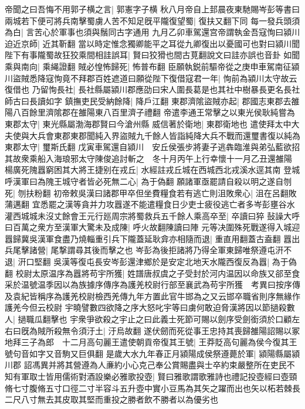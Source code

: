 帝聞之曰吾悔不用郭子横之言|{
	郭憲字子横}
秋八月帝自上邽晨夜東馳賜岑彭等書曰兩城若下便可將兵南擊蜀虜人苦不知足旣平隴復望蜀|{
	復扶又翻下同}
每一發兵頭須為白|{
	言苦心於軍事也須與鬚同古字通用}
九月乙卯車駕還宫帝謂執金吾寇恂曰潁川迫近京師|{
	近其靳翻}
當以時定惟念獨卿能平之耳從九卿復出以憂國可也對曰潁川聞陛下有事隴蜀故狂狡乘間相詿誤耳|{
	賢曰狡猾也間古莧翻說文曰詿亦誤也音卦}
如聞乘與南向|{
	乘䋲證翻}
賊必惶怖歸死|{
	怖普布翻}
臣願執鋭前驅帝從之庚申車駕南征潁川盜賊悉降寇恂竟不拜郡百姓遮道曰願從陛下復借寇君一年|{
	恂前為潁川太守故云復借也}
乃留恂長社|{
	長社縣屬潁川郡應劭曰宋人圍長葛是也其社中樹暴長更名長社師古曰長讀如字}
鎮撫吏民受納餘降|{
	降戶江翻}
東郡濟隂盜賊亦起|{
	郡國志東郡去雒陽八百餘里濟隂郡在雒陽東八百里濟子禮翻}
帝遣李通王常擊之以東光侯耿純嘗為東郡太守|{
	東光縣屬渤海郡賢曰今滄州縣}
威信著於衛地|{
	東郡衛地也}
遣使拜太中大夫使與大兵會東郡東郡聞純入界盜賊九千餘人皆詣純降大兵不戰而還璽書復以純為東郡太守|{
	璽斯氏翻}
戊寅車駕還自潁川　安丘侯張步將妻子逃犇臨淮與弟弘藍欲招其故衆乘船入海琅邪太守陳俊追討斬之　冬十月丙午上行幸懷十一月乙丑還雒陽　楊廣死隗囂窮困其大將王捷别在戎丘|{
	水經註戎丘城在西城西北戎溪水逕其南}
登城呼漢軍曰為隗王城守者皆必死無二心|{
	為于偽翻}
願諸軍亟罷請自殺以明之遂自刎死|{
	刎扶粉翻}
初帝敕吳漢曰諸郡甲卒但坐費糧食若有逃亡則沮敗衆心|{
	沮在呂翻敗蒲邁翻}
宜悉罷之漢等貪并力攻囂遂不能遣糧食日少吏士疲役逃亡者多岑彭壅谷水灌西城城未沒丈餘會王元行廵周宗將蜀救兵五千餘人乘高卒至|{
	卒讀曰猝}
鼔譟大呼曰百萬之衆方至漢軍大驚未及成陳|{
	呼火故翻陳讀曰陣}
元等决圍殊死戰遂得入城迎囂歸冀吳漢軍食盡乃燒輜重引兵下隴蓋延耿弇亦相隨而退|{
	重直用翻蓋古盍翻}
囂出兵尾擊諸營|{
	尾撃謂尋其後而擊之也}
岑彭為後拒諸將乃得全軍東歸唯祭遵屯汧不退|{
	汧口堅翻}
吳漢等復屯長安岑彭還津鄉於是安定北地天水隴西復反為囂|{
	為于偽翻}
校尉太原温序為囂將苟宇所獲|{
	姓譜唐叔虞之子受封於河内温因以命族又郤至食采於温號温季因以為族據序傳序為護羌校尉行部至襄武為苟宇所獲　考異曰按序傳及袁紀皆稱序為護羌校尉檢西羌傳九年方置此官牛邯為之又云邯卒職省則序無緣作護羌今但云校尉}
宇曉譬數四欲降之序大怒叱宇等曰虜何敢迫脅漢將因以節撾殺數人|{
	撾職瓜翻擊也}
宇衆爭欲殺之宇止之曰此義士死節可賜以劍序受劍銜須於口顧左右曰旣為賊所殺無令須汙土|{
	汙烏故翻}
遂伏劒而死從事王忠持其喪歸雒陽詔賜以冢地拜三子為郎　十二月高句麗王遣使朝貢帝復其王號|{
	王莽貶高句麗為侯今復其王號句音如字又音駒又巨俱翻}
是歲大水九年春正月潁陽成侯祭遵薨於軍|{
	潁陽縣屬潁川郡}
詔馮異并將其營遵為人亷約小心克己奉公賞賜盡與士卒約束嚴整所在吏民不知有軍取士皆用儒術對酒設樂必雅歌投壺|{
	賢曰雅歌謂歌雅詩也禮記投壺經曰壺頸脩七寸腹脩五寸口徑二寸半容斗五升壺中實小豆馬為其矢之躍而出也矢以柘若棘長二尺八寸無去其皮取其堅而重投之勝者飲不勝者以為優劣也}
